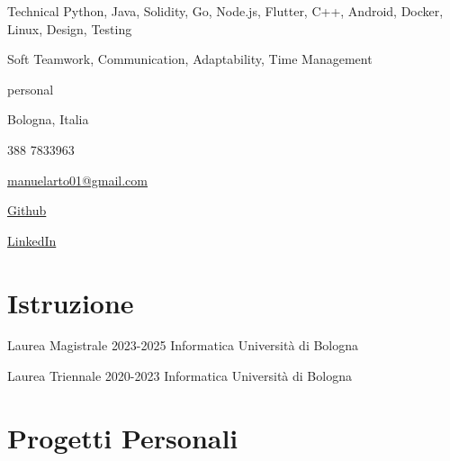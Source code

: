 \documentclass{tccv}
\begin{document}
\begin{factlist}

\item{Technical}
     {Python, Java, Solidity, Go, Node.js, Flutter, C++, Android, Docker, Linux, Design, Testing} \\

\item{Soft}
     {Teamwork, Communication, Adaptability, Time Management}

\end{factlist}



\newpage

\begin{keyvaluelist}{personal}
    \item[\faHome] Bologna, Italia
    \item[\faPhone] 388 7833963
    \item[\faEnvelope] \href{mailto:manuelarto01@gmail.com}{manuelarto01@gmail.com}
    \item[\faGithub] \href{https://github.com/manuelarto}{Github}
    \item[\faLinkedin] \href{https://www.linkedin.com/in/manuel-arto-696012203/}{LinkedIn}
\end{keyvaluelist}

\section{Istruzione}

\begin{yearlist}

\item[Laurea Magistrale]{2023-2025}
     {Informatica}
     {Università di Bologna}

\item[Laurea Triennale]{2020-2023}
    {Informatica}
    {Università di Bologna}

\end{yearlist}

\section{Progetti Personali}
\end{document}
